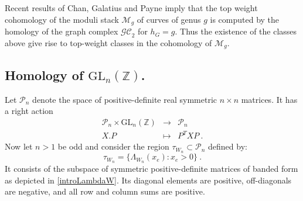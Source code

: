 \documentclass[10pt]{amsart}
\newcommand{\ZZ}{{\mathbb Z}}
\theoremstyle{plain}
\newcommand{\GL}{\mathrm{GL}}
\newcommand{\To}{\longrightarrow}
\newcommand{\GC}{\mathcal{GC}}
\newcommand{\0}{\color{blue}{\mathsf{0}}}
\begin{document}
Recent results of Chan, Galatius and Payne \cite{CGP} imply that the top weight cohomology of the moduli stack $\mathcal{M}_g$ of curves of genus $g$ is computed by the homology of the graph complex $\GC_2$ for $h_G=g.$ Thus the existence of the classes above give rise to top-weight classes in the cohomology  of $\mathcal{M}_g$.  

\subsection{Homology of \texorpdfstring{$\GL_n(\ZZ)$}{the general linear group}.}

Let $\mathcal{P}_n$ denote the space of positive-definite real symmetric 
$n\times n$ matrices. It has a  right action 
\begin{eqnarray} 
\mathcal{P}_n \times \GL_n(\ZZ) & \To & \mathcal{P}_n \nonumber  \\ 
X. P & \mapsto & P^T X P  \ . \nonumber 
\end{eqnarray} 
Now let $n>1$ be odd and consider the region $\tau_{W_n} \subset \mathcal{P}_n$ defined by: 
\[ \tau_{W_n} = \{ \Lambda_{W_n} (x_e) :  x_e >0 \} \ .  \]
It consists of the subspace of symmetric positive-definite matrices of banded form as depicted in \eqref{introLambdaW}. Its  diagonal elements are positive, off-diagonals are negative, and all row and column sums are positive. 
\end{document}
